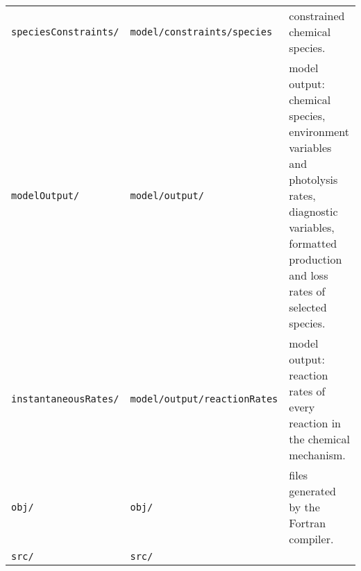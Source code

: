 \begin{longtable}[]{@{}lll@{}}
\begin{minipage}[t]{0.20\columnwidth}
\texttt{speciesConstraints/}\strut
\end{minipage} & \begin{minipage}[t]{0.24\columnwidth}\raggedright
\texttt{model/constraints/species}\strut
\end{minipage} & \begin{minipage}[t]{0.48\columnwidth}\raggedright
constrained chemical species.\strut
\end{minipage}\tabularnewline
\begin{minipage}[t]{0.20\columnwidth}\raggedright
\texttt{modelOutput/}\strut
\end{minipage} & \begin{minipage}[t]{0.24\columnwidth}\raggedright
\texttt{model/output/}\strut
\end{minipage} & \begin{minipage}[t]{0.48\columnwidth}\raggedright
model output: chemical species, environment variables and photolysis
rates, diagnostic variables, formatted production and loss rates of
selected species.\strut
\end{minipage}\tabularnewline
\begin{minipage}[t]{0.20\columnwidth}\raggedright
\texttt{instantaneousRates/}\strut
\end{minipage} & \begin{minipage}[t]{0.24\columnwidth}\raggedright
\texttt{model/output/reactionRates}\strut
\end{minipage} & \begin{minipage}[t]{0.48\columnwidth}\raggedright
model output: reaction rates of every reaction in the chemical
mechanism.\strut
\end{minipage}\tabularnewline
\begin{minipage}[t]{0.20\columnwidth}\raggedright
\texttt{obj/}\strut
\end{minipage} & \begin{minipage}[t]{0.24\columnwidth}\raggedright
\texttt{obj/}\strut
\end{minipage} & \begin{minipage}[t]{0.48\columnwidth}\raggedright
files generated by the Fortran compiler.\strut
\end{minipage}\tabularnewline
\begin{minipage}[t]{0.20\columnwidth}\raggedright
\texttt{src/}\strut
\end{minipage} & \begin{minipage}[t]{0.24\columnwidth}\raggedright
\texttt{src/}\strut
\end{minipage} & \begin{minipage}[t]{0.48\columnwidth}\raggedright

\end{minipage}
\end{longtable}
